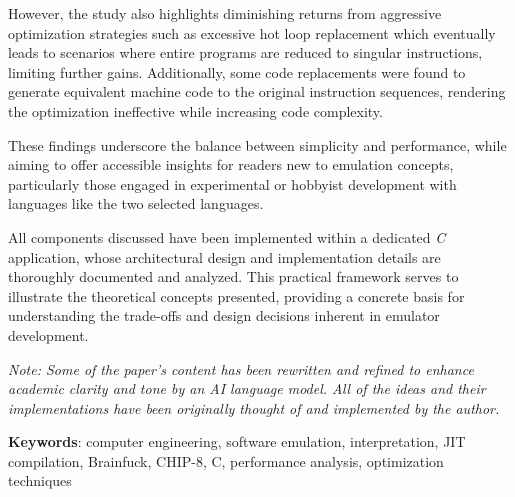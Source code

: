 \documentclass[12pt]{scrreport}
\begin{document}
\par However, the study also highlights diminishing returns from aggressive optimization strategies such as excessive hot loop replacement which eventually leads to scenarios where entire programs are reduced to singular instructions, limiting further gains. Additionally, some code replacements were found to generate equivalent machine code to the original instruction sequences, rendering the optimization ineffective while increasing code complexity.

\par These findings underscore the balance between simplicity and performance, while aiming to offer accessible insights for readers new to emulation concepts, particularly those engaged in experimental or hobbyist development with languages like the two selected languages.

\par All components discussed have been implemented within a dedicated \textit{C} application, whose architectural design and implementation details are thoroughly documented and analyzed. This practical framework serves to illustrate the theoretical concepts presented, providing a concrete basis for understanding the trade-offs and design decisions inherent in emulator development.

\vspace{0.5em}

\textit{Note: Some of the paper's content has been rewritten and refined to enhance academic clarity and tone by an AI language model. All of the ideas and their implementations have been originally thought of and implemented by the author.}

\vspace{0.5em}

\textbf{Keywords}: computer engineering, software emulation, interpretation, JIT compilation, Brainfuck, CHIP-8, C, performance analysis, optimization techniques

\tableofcontents
\newpage
{}









\end{document}
